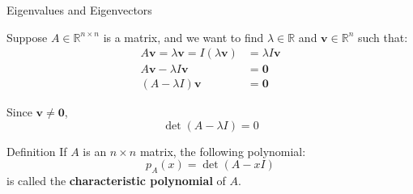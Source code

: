 \documentclass{beamer}
\newcommand{\vv}{\mathbf{v}}
\newcommand{\R}{\mathbb{R}}
\begin{document}
\begin{frame}{Eigenvalues and Eigenvectors}

Suppose $A\in\R^{n\times n}$ is a matrix, and we want to find $\lambda \in \R$ and $\vv\in\R^n$ such that:
\begin{align*}
    A\vv = \lambda \vv = I(\lambda \vv) &= \lambda I \vv\\
 A\vv - \lambda I \vv&=\mathbf{0} \\
 (A- \lambda I) \vv&=\mathbf{0}
\end{align*}

\pause Since $\vv \ne \textbf{0}$,
\[\det(A- \lambda I)=0\]
\pause


\begin{block}{Definition}
If \(A\) is an \(n \times n\) matrix, the following polynomial:
\begin{equation*}
    p_A(x) = \det(A - xI)
\end{equation*}
is called the \textbf{characteristic polynomial} of \(A\).
\end{block}
\end{frame}
\end{document}
